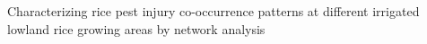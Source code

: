 Characterizing rice pest injury co-occurrence patterns at different irrigated lowland rice growing areas by network analysis